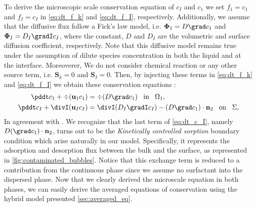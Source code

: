 To derive the microscopic scale conservation equation of $c_I$ and $c_1$ we set $f_1 = c_1$ and $f_I = c_I$ in \ref{eq:dt_f_k} and \ref{eq:dt_f_I}, respectively.
Additionally, we assume that the  diffusive flux follow a Fick's law model, i.e.  $\mathbf{\Phi}_1 = D\grad c_1$ and $\mathbf{\Phi}_I = D_I\gradI c_I$,
where the constant,  $D$ and $D_I$ are the volumetric and surface diffusion coefficient, respectively.
Note that this diffusive model remains true under the assumption of dilute species concentration in both the liquid and at the interface.
Moreoverer, We do not consider chemical reaction or any other source term, i.e. $\textbf{S}_k = 0$ and $\textbf{S}_I=0$. 
Then, by injecting these terms in \ref{eq:dt_f_k} and \ref{eq:dt_f_I} we obtain these conservation equations : 
\begin{align}
    \pddt c_1
    + \div (\textbf{u}_1 c_1)
    &= \div (D \grad c_1)
    \;\;\; \text{in} \;\;\; \Omega_1,\\
    \pddt c_I
    + \divI (\textbf{u}_I c_I)
    &= \divI (D_I \gradI c_I)
    - (D \grad c_1)\cdot \textbf{n}_2
    \;\;\; \text{on} \;\;\; \Sigma,
    \label{eq:dt_c_I}
\end{align}
In agreement with \citet{pesci2018computational,manikantan2020surfactant}.
We recognize that the last term of \ref{eq:dt_c_I}, namely $D(\grad c_1 ) \cdot \textbf{n}_2$, turns out to be the \textit{Kinetically controlled sorption} boundary condition \citet{pesci2018computational,manikantan2020surfactant} which arise naturally in our model.
Specifically, it represents the adsorption and desorption flux between the bulk and the surface, as represented in \ref{fig:contaminated_bubbles}.
Notice that this exchange term is reduced to a contribution from the continuous phase since we assume no surfactant into the dispersed phase. 
Now that we clearly derived the microscale equation in both phases, we can easily derive the averaged equations of conservation using the hybrid model presented \ref{sec:averaged_eq}.

